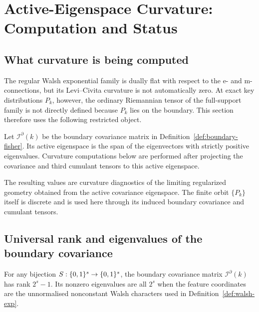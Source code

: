 \section{Active-Eigenspace Curvature: Computation and Status}\label{sec:curvature}

\subsection{What curvature is being computed}\label{subsec:curvature-status}

The regular Walsh exponential family is dually flat with respect to the e- and
m-connections, but its Levi--Civita curvature is not automatically zero.  At
exact key distributions $P_k$, however, the ordinary Riemannian tensor of the
full-support family is not directly defined because $P_k$ lies on the boundary.
This section therefore uses the following restricted object.

\begin{definition}\label{def:active-eigenspace}
Let $\mathcal I^{\partial}(k)$ be the boundary covariance matrix in
Definition~\ref{def:boundary-fisher}.  Its active eigenspace is the span of the
eigenvectors with strictly positive eigenvalues.  Curvature computations below
are performed after projecting the covariance and third cumulant tensors to this
active eigenspace.
\end{definition}

The resulting values are curvature diagnostics of the limiting regularized
geometry obtained from the active covariance eigenspace.  The finite orbit
$\{P_k\}$ itself is discrete and is used here through its induced boundary
covariance and cumulant tensors.

\subsection{Universal rank and eigenvalues of the boundary covariance}\label{subsec:rank-eigen}

\begin{theorem}\label{thm:active-rank}
For any bijection $S:\{0,1\}^{s}\to\{0,1\}^{s}$, the boundary covariance matrix
$\mathcal I^{\partial}(k)$ has rank $2^s-1$.  Its nonzero eigenvalues are all
$2^s$ when the feature coordinates are the unnormalised nonconstant Walsh
characters used in Definition~\ref{def:walsh-exp}.
\end{theorem}

